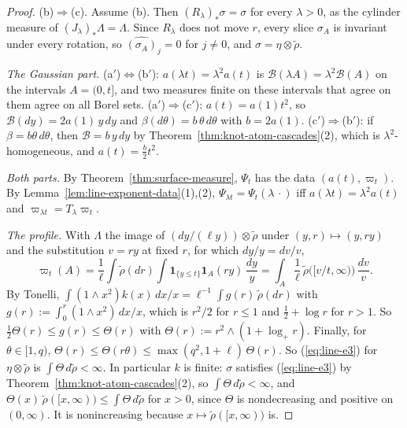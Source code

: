 \begin{proof}
(b)$\Rightarrow$(c). Assume (b). Then
$(R_\lambda)_*\sigma = \sigma$ for every $\lambda > 0$, as the cylinder measure of
$(J_\lambda)_*\Lambda = \Lambda$. Since $R_\lambda$ does not move $r$, every slice $\sigma_A$ is
invariant under every rotation, so $\widehat{(\sigma_A)}_j = 0$ for $j \ne 0$, and
$\sigma = \eta \otimes \tilde\rho$.

\emph{The Gaussian part.} (a$'$)$\Leftrightarrow$(b$'$): $a(\lambda t) = \lambda^2a(t)$ is
$\mathcal{B}(\lambda A) = \lambda^2\mathcal{B}(A)$ on the intervals $A = (0,t]$, and two measures
finite on these intervals that agree on them agree on all Borel sets. (a$'$)$\Rightarrow$(c$'$):
$a(t) = a(1)t^2$, so $\mathcal{B}(dy) = 2a(1)\,y\,dy$ and $\beta(d\theta) = b\,\theta\,d\theta$
with $b = 2a(1)$. (c$'$)$\Rightarrow$(b$'$): if $\beta = b\theta\,d\theta$, then
$\mathcal{B} = b\,y\,dy$ by Theorem~\ref{thm:knot-atom-cascades}(2), which is
$\lambda^2$-homogeneous, and $a(t) = \tfrac b2t^2$.

\emph{Both parts.} By Theorem~\ref{thm:surface-measure}, $\Psi_t$ has the data $(a(t), \varpi_t)$.
By Lemma~\ref{lem:line-exponent-data}(1),(2), $\Psi_{\lambda t} = \Psi_t(\lambda\,\cdot)$ iff
$a(\lambda t) = \lambda^2a(t)$ and $\varpi_{\lambda t} = T_\lambda\varpi_t$.

\emph{The profile.} With $\Lambda$ the image of $(dy/(\ell y)) \otimes \tilde\rho$ under
$(y,r) \mapsto (y, ry)$ and the substitution $v = ry$ at fixed $r$, for which $dy/y = dv/v$,
\[
  \varpi_t(A) = \frac1\ell\int\tilde\rho(dr)\int\mathbf 1_{\{y \le t\}}\mathbf 1_A(ry)\,\frac{dy}{y}
  = \int_A\frac1\ell\,\tilde\rho\bigl([v/t, \infty)\bigr)\,\frac{dv}{v}.
\]
By Tonelli, $\int(1 \wedge x^2)k(x)\,dx/x = \ell^{-1}\int g(r)\,\tilde\rho(dr)$ with
$g(r) := \int_0^r(1 \wedge x^2)\,dx/x$, which is $r^2/2$ for $r \le 1$ and $\tfrac12 + \log r$ for
$r > 1$. So $\tfrac12\Theta(r) \le g(r) \le \Theta(r)$ with $\Theta(r) := r^2 \wedge (1 + \log_+r)$. Finally, for
$\theta \in [1,q)$, $\Theta(r) \le \Theta(r\theta) \le \max(q^2, 1 + \ell)\,\Theta(r)$. So (\ref{eq:line-e3}) for
$\eta \otimes \tilde\rho$ is $\int \Theta\,d\tilde\rho < \infty$.
In particular $k$ is finite: $\sigma$ satisfies (\ref{eq:line-e3}) by Theorem~\ref{thm:knot-atom-cascades}(2),
so $\int \Theta\,d\tilde\rho < \infty$, and $\Theta(x)\,\tilde\rho([x,\infty)) \le \int \Theta\,d\tilde\rho$ for
$x > 0$, since $\Theta$ is nondecreasing and positive on $(0,\infty)$. It is nonincreasing because
$x \mapsto \tilde\rho([x,\infty))$ is.


\end{proof}
